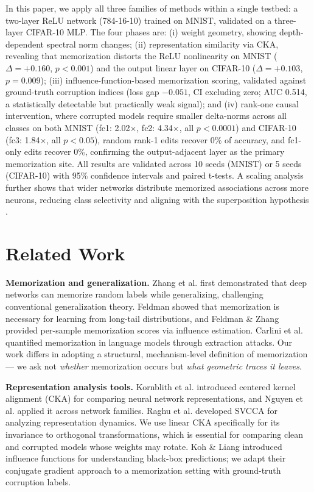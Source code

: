 \documentclass{article}
\begin{document}
In this paper, we apply all three families of methods within a single testbed: a two-layer ReLU network (784-16-10) trained on MNIST, validated on a three-layer CIFAR-10 MLP. The four phases are: (i) weight geometry, showing depth-dependent spectral norm changes; (ii) representation similarity via CKA, revealing that memorization distorts the ReLU nonlinearity on MNIST ($\Delta=+0.160$, $p<0.001$) and the output linear layer on CIFAR-10 ($\Delta=+0.103$, $p=0.009$); (iii) influence-function-based memorization scoring, validated against ground-truth corruption indices (loss gap $-0.051$, CI excluding zero; AUC 0.514, a statistically detectable but practically weak signal); and (iv) rank-one causal intervention, where corrupted models require smaller delta-norms across all classes on both MNIST (fc1: 2.02$\times$, fc2: 4.34$\times$, all $p<0.0001$) and CIFAR-10 (fc3: 1.84$\times$, all $p<0.05$), random rank-1 edits recover 0\% of accuracy, and fc1-only edits recover 0\%, confirming the output-adjacent layer as the primary memorization site. All results are validated across 10 seeds (MNIST) or 5 seeds (CIFAR-10) with 95\% confidence intervals and paired t-tests. A scaling analysis further shows that wider networks distribute memorized associations across more neurons, reducing class selectivity and aligning with the superposition hypothesis \cite{elhage2022toy}.

\section{Related Work}
\label{sec:related}

\textbf{Memorization and generalization.} Zhang et al. \cite{zhang2017understanding} first demonstrated that deep networks can memorize random labels while generalizing, challenging conventional generalization theory. Feldman \cite{feldman2020does} showed that memorization is necessary for learning from long-tail distributions, and Feldman \& Zhang \cite{feldman2020what} provided per-sample memorization scores via influence estimation. Carlini et al. \cite{carlini2022quantifying} quantified memorization in language models through extraction attacks. Our work differs in adopting a structural, mechanism-level definition of memorization — we ask not \emph{whether} memorization occurs but \emph{what geometric traces it leaves}.

\textbf{Representation analysis tools.} Kornblith et al. \cite{kornblith2019similarity} introduced centered kernel alignment (CKA) for comparing neural network representations, and Nguyen et al. \cite{nguyen2021wide} applied it across network families. Raghu et al. \cite{raghu2017svcca} developed SVCCA for analyzing representation dynamics. We use linear CKA specifically for its invariance to orthogonal transformations, which is essential for comparing clean and corrupted models whose weights may rotate. Koh \& Liang \cite{koh2017understanding} introduced influence functions for understanding black-box predictions; we adapt their conjugate gradient approach to a memorization setting with ground-truth corruption labels.
\end{document}
